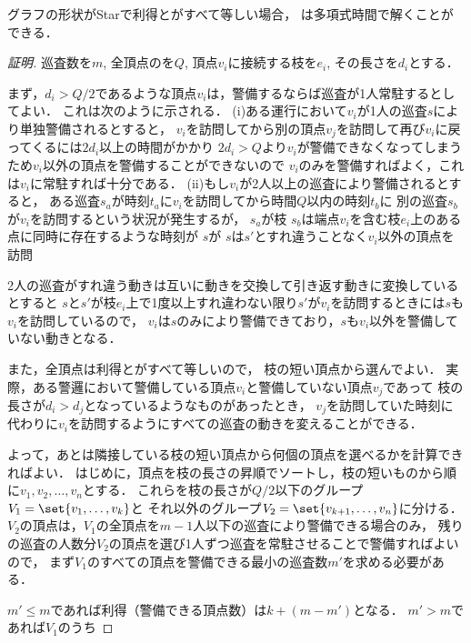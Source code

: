 \begin{theo}
	\label{theo:StarEqualProfitTimelimit}
	グラフの形状がStarで利得と{\idletime}がすべて等しい場合，
	{\patrolling}は多項式時間で解くことができる．
\end{theo}


\begin{proof}[証明]

	巡査数を$m$, 全頂点の{\idletime}を$Q$, 頂点$v_i$に接続する枝を$e_i$, その長さを$d_i$とする．

	まず，$d_i > Q/2$であるような頂点$v_i$は，警備するならば巡査が1人常駐するとしてよい．
	これは次のように示される．
	(i)ある運行において$v_i$が1人の巡査$s$により単独警備されるとすると，
	$v_i$を訪問してから別の頂点$v_j$を訪問して再び$v_i$に戻ってくるには$2d_i$以上の時間がかかり
	$2d_i > Q$より$v_i$が警備できなくなってしまうため$v_i$以外の頂点を警備することができないので
	$v_i$のみを警備すればよく，これは$v_i$に常駐すれば十分である．
	(ii)もし$v_i$が2人以上の巡査により警備されるとすると，
	ある巡査$s_a$が時刻$t_a$に$v_i$を訪問してから時間$Q$以内の時刻$t_b$に
	別の巡査$s_b$が$v_i$を訪問するという状況が発生するが，
	$s_a$が枝
	$s_b$は端点$v_i$を含む枝$e_i$上のある点に同時に存在するような時刻が
	$s$が
	$s$は$s'$とすれ違うことなく$v_i$以外の頂点を訪問



	2人の巡査がすれ違う動きは互いに動きを交換して引き返す動きに変換しているとすると
	$s$と$s'$が枝$e_i$上で1度以上すれ違わない限り$s'$が$v_i$を訪問するときには$s$も
	$v_i$を訪問しているので，
	$v_i$は$s$のみにより警備できており，$s$も$v_i$以外を警備していない動きとなる．


	また，全頂点は利得と{\idletime}がすべて等しいので，
	枝の短い頂点から選んでよい．
	実際，ある警邏において警備している頂点$v_i$と警備していない頂点$v_j$であって
	枝の長さが$d_i > d_j$となっているようなものがあったとき，
	$v_j$を訪問していた時刻に代わりに$v_i$を訪問するようにすべての巡査の動きを変えることができる．


	よって，あとは隣接している枝の短い頂点から何個の頂点を選べるかを計算できればよい．
	はじめに，頂点を枝の長さの昇順でソートし，枝の短いものから順に$v_1,v_2, \ldots, v_n$とする．
	これらを枝の長さが$Q/2$以下のグループ$V_1 = \set{v_1, \ldots, v_k}$と
	それ以外のグループ$V_2 = \set{ v_{k + 1}, \ldots, v_n }$に分ける．
	$V_2$の頂点は，$V_1$の全頂点を$m - 1$人以下の巡査により警備できる場合のみ，
	残りの巡査の人数分$V_2$の頂点を選び1人ずつ巡査を常駐させることで警備すればよいので，
	まず$V_1$のすべての頂点を警備できる最小の巡査数$m'$を求める必要がある．

	$m' \leq m$であれば利得（警備できる頂点数）は$k + (m - m')$となる．
	$m' > m$であれば$V_1$のうち

\end{proof}












